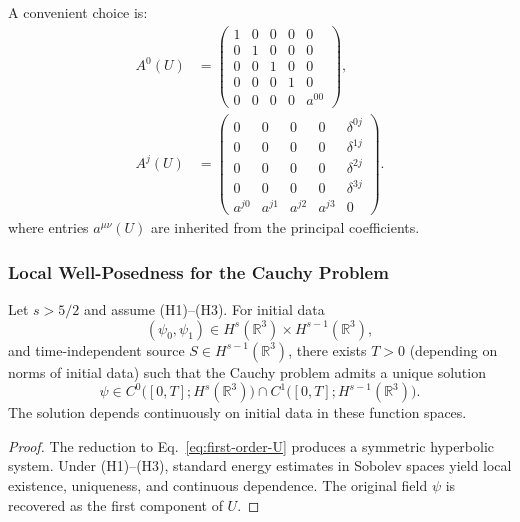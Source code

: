 A convenient choice is:
\begin{align}
A^0(U) &= \begin{pmatrix}
1 & 0 & 0 & 0 & 0 \\
0 & 1 & 0 & 0 & 0 \\
0 & 0 & 1 & 0 & 0 \\
0 & 0 & 0 & 1 & 0 \\
0 & 0 & 0 & 0 & a^{00}
\end{pmatrix}, \\[6pt]
A^j(U) &= \begin{pmatrix}
0 & 0 & 0 & 0 & \delta^{0j} \\
0 & 0 & 0 & 0 & \delta^{1j} \\
0 & 0 & 0 & 0 & \delta^{2j} \\
0 & 0 & 0 & 0 & \delta^{3j} \\
a^{j0} & a^{j1} & a^{j2} & a^{j3} & 0
\end{pmatrix}.
\end{align}
where entries $a^{\mu\nu}(U)$ are inherited from the principal coefficients.

\subsubsection{Local Well-Posedness for the Cauchy Problem}

\begin{theorem}\label{thm:cauchy-U}
Let $s > 5/2$ and assume (H1)--(H3). For initial data
\begin{equation}
(\psi_0, \psi_1) \in H^s(\mathbb{R}^3) \times H^{s-1}(\mathbb{R}^3),
\end{equation}
and time-independent source $S \in H^{s-1}(\mathbb{R}^3)$, there exists $T > 0$ 
(depending on norms of initial data) such that the Cauchy problem admits a 
unique solution
\begin{equation}
\psi \in C^0\bigl([0,T]; H^s(\mathbb{R}^3)\bigr) \cap C^1\bigl([0,T]; H^{s-1}(\mathbb{R}^3)\bigr).
\end{equation}
The solution depends continuously on initial data in these function spaces.
\end{theorem}

\begin{proof}
The reduction to Eq.~\eqref{eq:first-order-U} produces a symmetric hyperbolic 
system. Under (H1)--(H3), standard energy estimates in Sobolev spaces yield 
local existence, uniqueness, and continuous dependence. The original field 
$\psi$ is recovered as the first component of $U$.
\end{proof}

